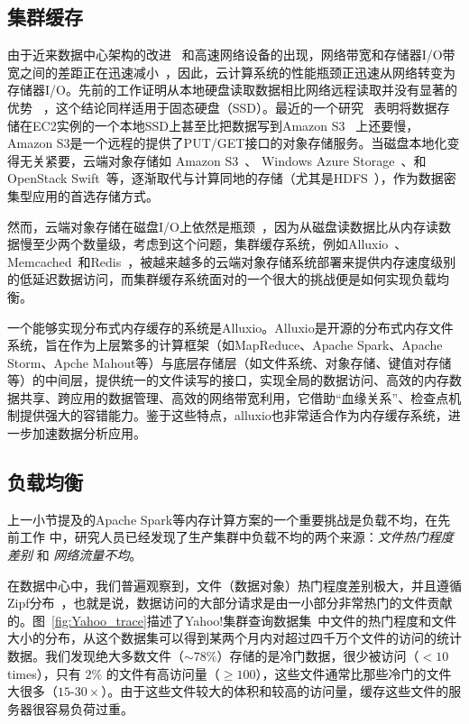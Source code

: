 \subsection{集群缓存}
\par 由于近来数据中心架构的改进~\cite{singh2015jupiter} 和高速网络设备的出现\cite{huawei_nuwa,asanovic2014firebox,alistarh15a}，网络带宽和存储器I/O带宽之间的差距正在迅速减小~\cite{latency_trends,p802_3ba,Han13a,Gao16a}，因此，云计算系统的性能瓶颈正迅速从网络转变为存储器I/O。先前的工作证明从本地硬盘读取数据相比网络远程读取并没有显著的优势 ~\cite{Ananthanarayanan11a}，这个结论同样适用于固态硬盘（SSD）。最近的一个研究~\cite{Jonas17a} 表明将数据存储在EC2实例的一个本地SSD上甚至比把数据写到Amazon S3 ~\cite{amazons3}上还要慢，Amazon S3是一个远程的提供了PUT/GET接口的对象存储服务。当磁盘本地化变得无关紧要，云端对象存储如 Amazon S3~\cite{amazons3}、 Windows Azure Storage~\cite{azure_storage}、和OpenStack Swift~\cite{swift}等，逐渐取代与计算同地的存储（尤其是HDFS~\cite{shvachko2010hadoop}），作为数据密集型应用的首选存储方式。

\par 然而，云端对象存储在磁盘I/O上依然是瓶颈~\cite{rashmi2016ec}，因为从磁盘读数据比从内存读数据慢至少两个数量级，考虑到这个问题，集群缓存系统，例如Alluxio~\cite{alluxio}、Memcached~\cite{memcached}和Redis~\cite{redis}，被越来越多的云端对象存储系统部署来提供内存速度级别的低延迟数据访问，而集群缓存系统面对的一个很大的挑战便是如何实现负载均衡。

\par 一个能够实现分布式内存缓存的系统是Alluxio。Alluxio\cite{li2014tachyon}是开源的分布式内存文件系统，旨在作为上层繁多的计算框架（如MapReduce、Apache Spark、Apache Storm、Apche Mahout等）与底层存储层（如文件系统、对象存储、键值对存储等）的中间层，提供统一的文件读写的接口，实现全局的数据访问、高效的内存数据共享、跨应用的数据管理、高效的网络带宽利用，它借助“血缘关系”、检查点机制提供强大的容错能力。鉴于这些特点，alluxio也非常适合作为内存缓存系统，进一步加速数据分析应用。


\subsection{负载均衡}
\par 上一小节提及的Apache Spark等内存计算方案的一个重要挑战是负载不均，在先前工作 
\cite{ananthanarayanan2011scarlett,rashmi2016ec} 中，研究人员已经发现了生产集群中负载不均的两个来源：\emph{文件热门程度差别} 和 \emph{网络流量不均}。

\par 在数据中心中，我们普遍观察到，文件（数据对象）热门程度差别极大，并且遵循Zipf分布~\cite{rashmi2016ec, ananthanarayanan2011scarlett, ananthanarayanan2012pacman, li2014tachyon}，也就是说，数据访问的大部分请求是由一小部分非常热门的文件贡献的。图~\ref{fig:Yahoo_trace}描述了Yahoo!集群查询数据集~\cite{yahoo!_trace}中文件的热门程度和文件大小的分布，从这个数据集可以得到某两个月内对超过四千万个文件的访问的统计数据。我们发现绝大多数文件（$\sim 78\%$）存储的是冷门数据，很少被访问（$<10$ times），只有 $2\%$ 的文件有高访问量（$\ge100$），这些文件通常比那些冷门的文件大很多（$15$-$30 \times$）。由于这些文件较大的体积和较高的访问量，缓存这些文件的服务器很容易负荷过重。


